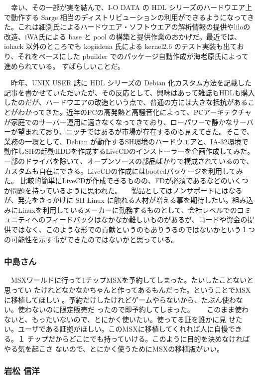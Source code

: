 \documentclass[mingoth]{jsarticle}
\begin{document}
　幸い、その一部が実を結んで、I-O DATA の HDL シリーズのハードウエア上で動作する Sarge
相当のディストリビューションの利用ができるようになってきた。これは細渕氏によるハードウエア・ソフトウエアの解析情報の提供やliloの改造、iWA氏による
base と pool の構築と提供作業のおかげだ。最近では、iohack 以外のところでも kogiidena 氏による
kernel2.6 のテスト実装も出ており、それをベースにした pbuilder でのパッケージ自動作成が海老原氏によって進められている。
すばらしいことだ。

　昨年、UNIX USER 誌に HDL シリーズの Debian
化カスタム方法を記載した記事を書かせていただいたが、その反応として、興味はあって雑誌もHDLも購入したのだが、ハードウエアの改造という点で、普通の方には大きな抵抗があることがわかってきた。近年のPCの高発熱と高騒音化によって、PCアーキテクチャが家庭でのサーバー運用に適さなくなってきており、ローパワーで静かなサーバーが望まれており、ニッチではあるが市場が存在するのも見えてきた。そこで、業務の一環として、Debian
が動作するSH環境のハードウエアと、IA-32環境で動作しSHの起動HDDを作成するLiveCDのインストーラーを企画作成してみた。一部のドライバを除いて、オープンソースの部品ばかりで構成されているので、カスタムも自在にできる。LiveCDの作成にはbootcdパッケージを利用してみた。
比較的簡単にLiveCDが作成できるものの、FDが必須であるなどのいくつか問題を持っているように思われた。
　製品としてはノンサポートにはなるが、発売をきっかけに SH-Linux
に触れる人材が増える事を期待したい。組み込みにLinuxを利用しているメーカーに勤務するものとして、会社レベルでのコミュニティへのフィードバックはなかなか難しいものがあるが、コードや資金の提供ではなく、このような形での貢献というのもありうるのではないかという１つの可能性を示す事ができたのではないかと思っている。

\subsubsection{中島さん}

　MSXワールドに行って1チップMSXを予約してしまった。たいしたことないと思ってい
たけれどなかなかちゃんと作ってあるもんだった。ということでMSXに移植してほしい
。予約だけしたけれどゲームやらないから、たぶん使わない。使わないのに限定販売だ
ったので即予約してしまった。　
　このまま使わないと、もったいないので、とにかく使いたい。使ってる証を誰かに見
せたい。ユーザである証拠がほしい。このMSXに移植してくれれば人に自慢できる。１
チップだからどこにでも持っていける。このように目的を決めなければやる気を起こさ
ないので、とにかく使うためにMSXの移植版がいい。


\subsubsection{岩松 信洋}
\end{document}
